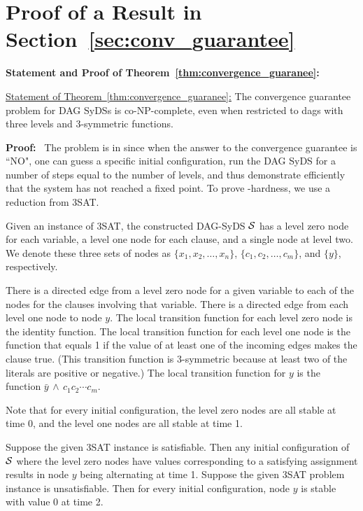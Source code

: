 \bigskip


\section{Proof of a Result in Section~\ref{sec:conv_guarantee}}

\medskip

\noindent
\textbf{Statement and Proof of Theorem~\ref{thm:convergence_guaranee}:}

\medskip

\noindent
\underline{Statement of Theorem~\ref{thm:convergence_guaranee}:}
The convergence guarantee problem for DAG SyDSs is co-NP-complete,
even when restricted to dags with three levels and 3-symmetric functions.

\medskip

\noindent
\textbf{Proof:}~ The problem is in \cconp{} since when the answer to the
convergence guarantee is ``NO", one can guess a specific initial configuration,
run the DAG SyDS for a number of steps equal to the number of levels, and
thus demonstrate efficiently that the system has not reached a fixed point.
To prove \cnp-hardness, we use a reduction from 3SAT.

Given an instance of 3SAT,
the constructed DAG-SyDS $\mbox{$\mathcal{S}$}$ has a level zero node for each variable, 
a level one node for each clause, and a single node at level two.
We denote these three sets of nodes as $\{x_1, x_2, \ldots , x_n\}$,
$\{c_1,c_2, \ldots , c_m\}$, and $\{y\}$, respectively.

There is a directed edge from a  level zero node for a given variable
to each of  the nodes for the clauses involving that variable.
There is a directed edge from each level one node to node $y$.  The
local transition function for each level zero node is the identity
function.  The local transition function for each level one node
is the function that equals 1
if the value of at least one of the incoming edges
makes the clause true.  (This transition function is 3-symmetric
because at least two of the literals are positive or negative.) The
local transition function for $y$ is the function 
$\bar{y} \, \wedge \, c_1 c_2 \cdots  c_{m}$.

Note that for every initial configuration, the level zero nodes are
all stable at time 0, and the level one nodes are all stable at
time 1.

\smallskip

Suppose the given 3SAT instance is satisfiable.
Then any initial configuration of $\mbox{$\mathcal{S}$}$ where the level zero nodes 
have values corresponding to a satisfying assignment
results in node $y$ being alternating at time 1.
Suppose the given 3SAT problem instance is unsatisfiable.
Then for every initial configuration, node $y$ is stable with value 0 at time 2.

